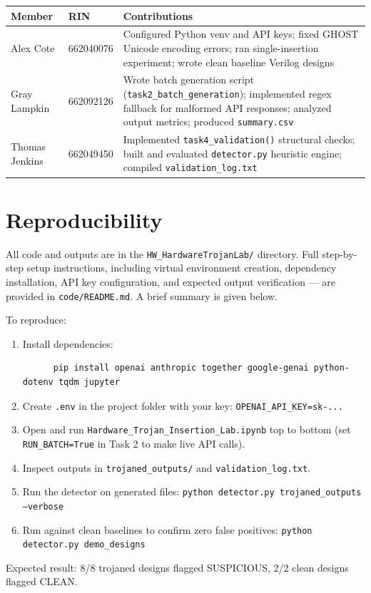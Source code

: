 \documentclass[11pt]{article}
\begin{document}
\begin{table}[h]
\centering
\fontsize{10}{12}\selectfont
\begin{tabular}{@{}p{2.8cm} p{1.4cm} p{9cm}@{}}
\toprule
\textbf{Member} & \textbf{RIN} & \textbf{Contributions} \\
\midrule
{Alex Cote} & {662040076} & Configured Python venv and API keys; fixed GHOST Unicode encoding errors; ran single-insertion experiment; wrote clean baseline Verilog designs \\
{Gray Lampkin} & {662092126} & Wrote batch generation script (\texttt{task2\_batch\_generation}); implemented regex fallback for malformed API responses; analyzed output metrics; produced \texttt{summary.csv} \\
{Thomas Jenkins} & {662049450} & Implemented \texttt{task4\_validation()} structural checks; built and evaluated \texttt{detector.py} heuristic engine; compiled \texttt{validation\_log.txt} \\
\bottomrule
\end{tabular}
\end{table}

\pagebreak
\section*{Reproducibility}
\label{sec:repro}

All code and outputs are in the \texttt{HW\_HardwareTrojanLab/} directory. Full step-by-step setup instructions, including virtual environment creation, dependency installation, API key configuration, and expected output verification --- are provided in \texttt{code/README.md}. A brief summary is given below.

To reproduce:

\begin{enumerate}[leftmargin=*, itemsep=1pt, topsep=2pt]
  \item Install dependencies: 
    \begin{verbatim}
      pip install openai anthropic together google-genai python-dotenv tqdm jupyter
    \end{verbatim}
  \item Create \texttt{.env} in the project folder with your key:\newline
        \texttt{OPENAI\_API\_KEY=sk-...}
  \item Open and run \texttt{Hardware\_Trojan\_Insertion\_Lab.ipynb} top to bottom (set \texttt{RUN\_BATCH=True} in Task 2 to make live API calls).
  \item Inspect outputs in \texttt{trojaned\_outputs/} and \texttt{validation\_log.txt}.
  \item Run the detector on generated files:\newline
        \texttt{python detector.py trojaned\_outputs --verbose}
  \item Run against clean baselines to confirm zero false positives:\newline
        \texttt{python detector.py demo\_designs}
\end{enumerate}

Expected result: 8/8 trojaned designs flagged SUSPICIOUS, 2/2 clean designs flagged CLEAN.
\end{document}
